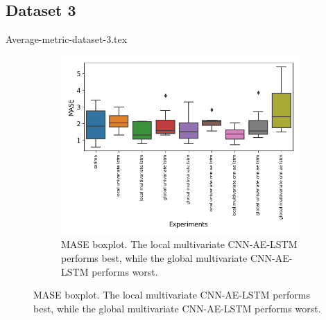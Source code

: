 \subsection{Dataset 3}
\begin{samepage}
  {Average-metric-dataset-3.tex}
  \begin{figure}[h!]
    \centering
    \caption{Boxplot of predictions made on the seasonal dataset 3}
    \begin{subfigure}[t]{0.49\textwidth}
      \includegraphics[width=\textwidth]{./figs/results/boxplot/mase-dataset_3.png}
      \hfill
      \caption{MASE boxplot. The local multivariate CNN-AE-LSTM performs best,
        while the global multivariate CNN-AE-LSTM performs worst.}
      \label{fig:results:boxplot-mase-dataset-3}


\end{subfigure}
\end{figure}
\end{samepage}
